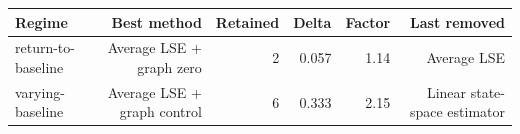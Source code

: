 \begin{tabular}{lrrrrr}
\toprule
Regime & Best method & Retained & Delta & Factor & Last removed \\
\midrule
return-to-baseline & Average LSE + graph zero & 2 & 0.057 & 1.14 & Average LSE \\
varying-baseline & Average LSE + graph control & 6 & 0.333 & 2.15 & Linear state-space estimator \\
\bottomrule
\end{tabular}
